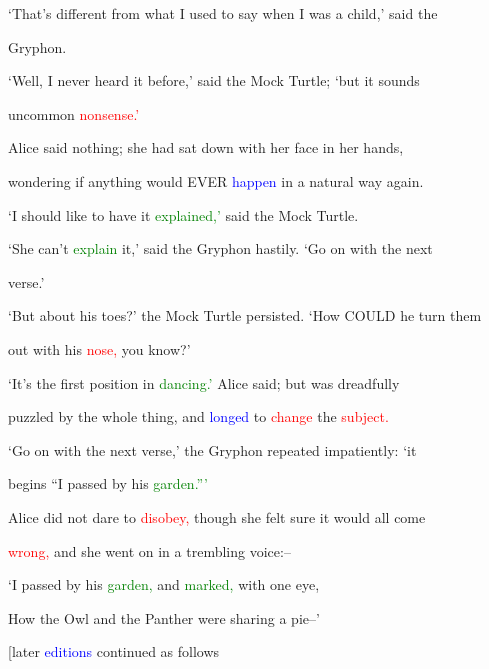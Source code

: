  ‘That’s different from what I used to say when I was a \textcolor{BurntOrange}{child,’} said the

 Gryphon.



 ‘Well, I never heard it before,’ said the Mock Turtle; ‘but it sounds

 uncommon \textcolor{red}{nonsense.’}



 Alice said nothing; she had sat down with her face in her hands,

 wondering if anything would EVER \textcolor{blue}{happen} in a natural way again.



 ‘I should like to have it \textcolor{green}{explained,’} said the Mock Turtle.



 ‘She can’t \textcolor{green}{explain} it,’ said the Gryphon hastily. ‘Go on with the next

 verse.’



 ‘But about his toes?’ the Mock Turtle persisted. ‘How COULD he turn them

 out with his \textcolor{red}{nose,} you know?’



 ‘It’s the first position in \textcolor{green}{dancing.’} Alice said; but was \textcolor{BurntOrange}{dreadfully}

 puzzled by the whole thing, and \textcolor{blue}{longed} to \textcolor{red}{change} the \textcolor{red}{subject.}



 ‘Go on with the next verse,’ the Gryphon repeated impatiently: ‘it

 begins “I passed by his \textcolor{green}{garden.”’}



 Alice did not \textcolor{BurntOrange}{dare} to \textcolor{red}{disobey,} though she felt sure it would all come

 \textcolor{red}{wrong,} and she went on in a trembling voice:--



 ‘I passed by his \textcolor{green}{garden,} and \textcolor{green}{marked,} with one eye,

 How the Owl and the Panther were \textcolor{BurntOrange}{sharing} a pie--’



 [later \textcolor{blue}{editions} continued as follows

